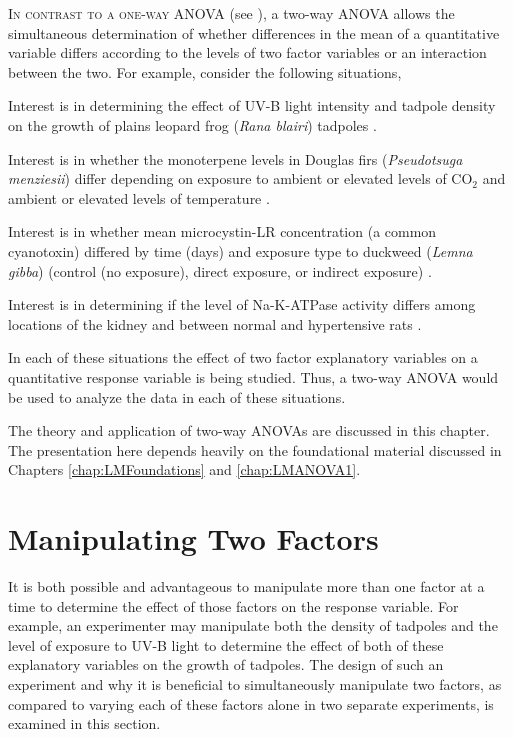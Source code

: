 \documentclass[10pt,openany]{book}\usepackage[]{graphicx}\usepackage[]{color}
\begin{document}
\lettrine{I}{n contrast to a one-way ANOVA} (see ), a two-way ANOVA allows the simultaneous determination of whether differences in the mean of a quantitative variable differs according to the levels of two factor variables or an interaction between the two.  For example, consider the following situations,
\begin{Itemize}
  \item Interest is in determining the effect of UV-B light intensity and tadpole density on the growth of plains leopard frog (\emph{Rana blairi}) tadpoles \citep{Smithetal2000}.
  \item Interest is in whether the monoterpene levels in Douglas firs (\emph{Pseudotsuga menziesii}) differ depending on exposure to ambient or elevated levels of CO$_{2}$ and ambient or elevated levels of temperature \citep{Snowetal2003}.
  \item Interest is in whether mean microcystin-LR concentration (a common cyanotoxin) differed by time (days) and exposure type to duckweed (\emph{Lemna gibba}) (control (no exposure), direct exposure, or indirect exposure) \citep{LeBlancetal2005}.
  \item Interest is in determining if the level of Na-K-ATPase activity differs among locations of the kidney and between normal and hypertensive rats \citep{Gargetal1985}.
\end{Itemize}

In each of these situations the effect of two factor explanatory variables on a quantitative response variable is being studied.  Thus, a two-way ANOVA would be used to analyze the data in each of these situations.

The theory and application of two-way ANOVAs are discussed in this chapter.  The presentation here depends heavily on the foundational material discussed in Chapters \ref{chap:LMFoundations} and \ref{chap:LMANOVA1}.


\section{Manipulating Two Factors}
It is both possible and advantageous to manipulate more than one factor at a time to determine the effect of those factors on the response variable.  For example, an experimenter may manipulate both the density of tadpoles and the level of exposure to UV-B light to determine the effect of both of these explanatory variables on the growth of tadpoles.  The design of such an experiment and why it is beneficial to simultaneously manipulate two factors, as compared to varying each of these factors alone in two separate experiments, is examined in this section.
\end{document}
